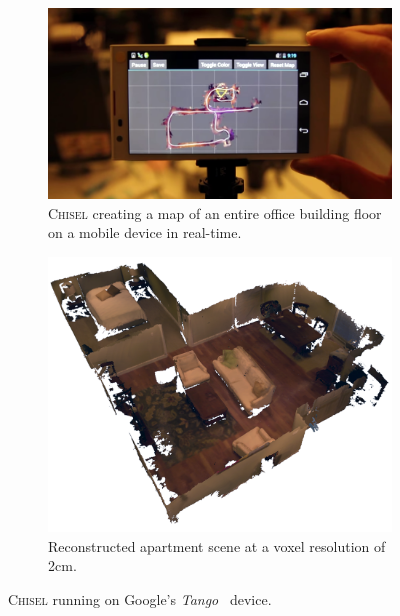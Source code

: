 \documentclass[conference]{IEEEtran}
\newcommand{\Tango}{\textit{Tango}\xspace}
\newcommand{\chisel}{\textsc{Chisel}\xspace}
\begin{document}
\begin{figure}[t!]
  \centering
    	 \begin{subfigure}{\linewidth} \centering
		 \includegraphics[width=1\textwidth]{img/mapdevice}
		 \caption{\chisel creating a map
      of an entire office building floor on a mobile device in real-time.}
		 \label{fig:map_device}
	 \end{subfigure}
      	 \begin{subfigure}{\linewidth} \centering
		 \includegraphics[width=1\textwidth]{img/apartment_scene_color.png}
		 \caption{Reconstructed apartment scene at a voxel resolution of 2cm.}
		 \label{fig:apartment_color}
	 \end{subfigure}
      \caption{\chisel running on Google's \Tango~\cite{Tango} device.}
  \label{fig:first_figure}
\end{figure} 
\end{document}
